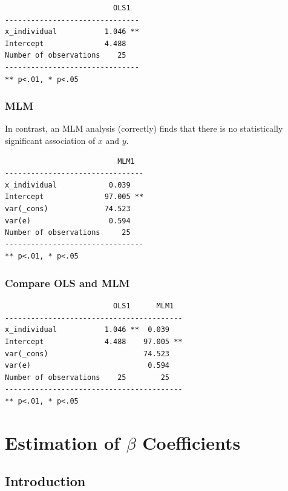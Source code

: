 \documentclass[
  letterpaper,
  DIV=11,
  numbers=noendperiod]{scrreprt}
\begin{document}
\begin{verbatim}
                         OLS1  
-------------------------------
x_individual           1.046 **
Intercept              4.488   
Number of observations    25   
-------------------------------
** p<.01, * p<.05
\end{verbatim}

\subsection{MLM}\label{mlm}

In contrast, an MLM analysis (correctly) finds that there is no
statistically significant association of \(x\) and \(y\).

\begin{verbatim}
                          MLM1  
--------------------------------
x_individual            0.039   
Intercept              97.005 **
var(_cons)             74.523   
var(e)                  0.594   
Number of observations     25   
--------------------------------
** p<.01, * p<.05
\end{verbatim}

\subsection{Compare OLS and MLM}\label{compare-ols-and-mlm}

\begin{verbatim}
                         OLS1      MLM1  
-----------------------------------------
x_individual           1.046 **  0.039   
Intercept              4.488    97.005 **
var(_cons)                      74.523   
var(e)                           0.594   
Number of observations    25        25   
-----------------------------------------
** p<.01, * p<.05
\end{verbatim}


\chapter{\texorpdfstring{Estimation of \(\beta\)
Coefficients}{Estimation of \textbackslash beta Coefficients}}\label{sec-multilevelstructure}

\section{Introduction}\label{introduction-1}
\end{document}
